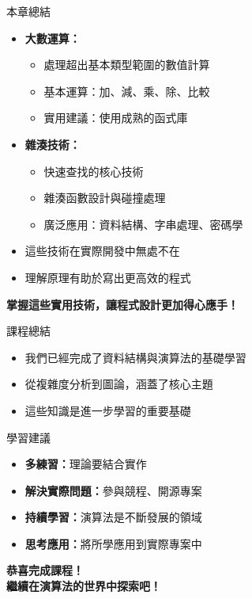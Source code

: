 \documentclass{beamer}
\begin{document}
\begin{frame}{本章總結}
\begin{itemize}
    \item \textbf{大數運算：}
    \begin{itemize}
        \item 處理超出基本類型範圍的數值計算
        \item 基本運算：加、減、乘、除、比較
        \item 實用建議：使用成熟的函式庫
    \end{itemize}
    \item \textbf{雜湊技術：}
    \begin{itemize}
        \item 快速查找的核心技術
        \item 雜湊函數設計與碰撞處理
        \item 廣泛應用：資料結構、字串處理、密碼學
    \end{itemize}
    \item 這些技術在實際開發中無處不在
    \item 理解原理有助於寫出更高效的程式
\end{itemize}

\vspace{1em}
\begin{center}
    \textbf{掌握這些實用技術，讓程式設計更加得心應手！}
\end{center}
\end{frame}

\begin{frame}{課程總結}
\begin{itemize}
    \item 我們已經完成了資料結構與演算法的基礎學習
    \item 從複雜度分析到圖論，涵蓋了核心主題
    \item 這些知識是進一步學習的重要基礎
\end{itemize}

\vspace{1em}
\begin{block}{學習建議}
\begin{itemize}
    \item \textbf{多練習：}理論要結合實作
    \item \textbf{解決實際問題：}參與競程、開源專案
    \item \textbf{持續學習：}演算法是不斷發展的領域
    \item \textbf{思考應用：}將所學應用到實際專案中
\end{itemize}
\end{block}

\vspace{1em}
\begin{center}
    \textbf{恭喜完成課程！}\\
    \textbf{繼續在演算法的世界中探索吧！}
\end{center}
\end{frame}
\end{document}
